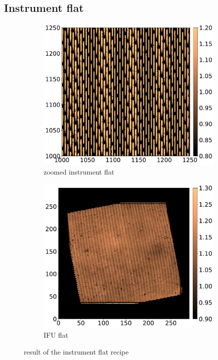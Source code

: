 \documentclass[twoside,single]{lion-msc}
\begin{document}
\subsection{Instrument flat}
\begin{figure}[!b]
\centering
\begin{subfigure}{.48\textwidth}
  \centering
  \includegraphics[width=1\linewidth]{instrumentflat}
  \caption{zoomed instrument flat}
\end{subfigure}\hfill
\begin{subfigure}{.48\textwidth}
  \centering
  \includegraphics[width=1\linewidth]{IFU_flat}
  \caption{IFU flat}
\end{subfigure}
\caption{result of the instrument flat recipe}
\label{fig:instrumentflatrecipe}
\end{figure}
\end{document}
